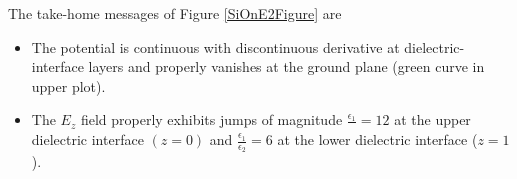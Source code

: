 \documentclass[letterpaper]{article}
\renewcommand{\wt}{\widetilde}
\begin{document}
The take-home messages of Figure \ref{SiOnE2Figure} are 
\begin{itemize}
 \item The potential is continuous with discontinuous derivative
       at dielectric-interface layers and properly vanishes at 
       the ground plane (green curve in upper plot).
 \item The $E_z$ field properly exhibits jumps of magnitude
       $\frac{\epsilon_1}{}=12$ at the upper dielectric 
       interface $(z=0)$ and 
       $\frac{\epsilon_1}{\epsilon_2}=6$ at the lower dielectric interface
       ($z=1$).
\end{itemize}

%
%
\end{document}
